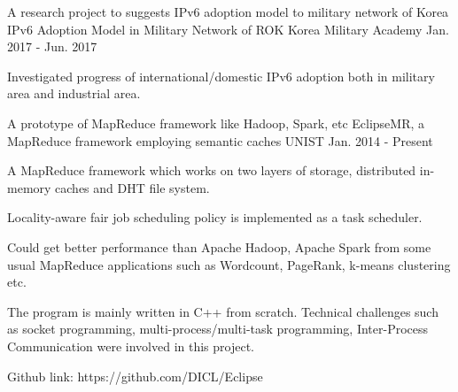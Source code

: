\begin{cventries}

\cventry
{A research project to suggests IPv6 adoption model to military network of Korea} %
{IPv6 Adoption Model in Military Network of ROK} %
{Korea Military Academy} %
{Jan. 2017 - Jun. 2017} %
{ %
\begin{cvitems}
\item {Investigated progress of international/domestic IPv6 adoption both in military
area and industrial area.}
\end{cvitems}
}


\cventry
{A prototype of MapReduce framework like Hadoop, Spark, etc} %
{EclipseMR, a MapReduce framework employing semantic caches} %
{UNIST} %
{Jan. 2014 - Present} %
{ %
\begin{cvitems}
\item {A MapReduce framework which works on two layers of storage, distributed in-memory
caches and DHT file system.}
\item {Locality-aware fair job scheduling policy is implemented as a task scheduler.}
\item {Could get better performance than Apache Hadoop, Apache Spark from some usual
MapReduce applications such as Wordcount, PageRank, k-means clustering etc.}
\item {The program is mainly written in C++ from scratch. Technical challenges such as socket
programming, multi-process/multi-task programming, Inter-Process Communication were involved
in this project.}
\item {Github link: https://github.com/DICL/Eclipse}
\end{cvitems}
}



\end{cventries}
